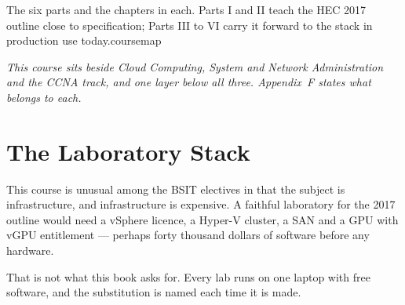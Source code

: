 {}%
{The six parts and the chapters in each. Parts I and II teach the HEC 2017
outline close to specification; Parts III to VI carry it forward to the stack
in production use today.}{coursemap}

\vspace{4pt}
{\small\itshape\color{gray!70!black}
This course sits beside \emph{Cloud Computing}, \emph{System and Network
Administration} and the CCNA track, and one layer below all three.
Appendix~F states what belongs to each.}

\newpage

\chapter*{The Laboratory Stack}

This course is unusual among the BSIT electives in that the subject is
infrastructure, and infrastructure is expensive. A faithful laboratory for the
2017 outline would need a vSphere licence, a Hyper-V cluster, a SAN and a
GPU with vGPU entitlement --- perhaps forty thousand dollars of software before
any hardware.

That is not what this book asks for. Every lab runs on one laptop with free
software, and the substitution is named each time it is made.

